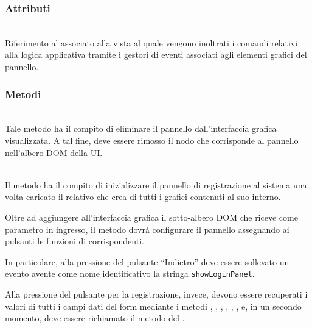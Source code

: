 \subsubsection*{Attributi}
\begin{description}
  \item{}\\
  Riferimento al  associato alla vista al quale vengono inoltrati i comandi relativi alla logica applicativa tramite i gestori di eventi associati agli elementi grafici del pannello.
\end{description}

\subsubsection*{Metodi}
\begin{description}
  \item{}\\
  Tale metodo ha il compito di eliminare il pannello dall’interfaccia grafica visualizzata. A tal fine, deve essere rimosso il nodo che corrisponde al pannello nell’albero DOM della UI\@.
  
  \item{}\\
  	Il metodo ha il compito di inizializzare il pannello di registrazione al sistema una volta caricato il relativo  che crea di tutti i  grafici contenuti al suo interno.
	
	Oltre ad aggiungere all'interfaccia grafica il sotto-albero DOM che riceve come parametro in ingresso, il metodo dovrà configurare il pannello assegnando ai pulsanti le funzioni di  corrispondenti.
	
	In particolare, alla pressione del pulsante ``Indietro'' deve essere sollevato un evento avente come nome identificativo la stringa \verb'showLoginPanel'.
	
  Alla pressione del pulsante per la registrazione, invece, devono essere recuperati i valori di tutti i campi dati del form mediante i metodi , , , , , ,  e, in un secondo momento, deve essere richiamato il metodo  del .

\end{description}

